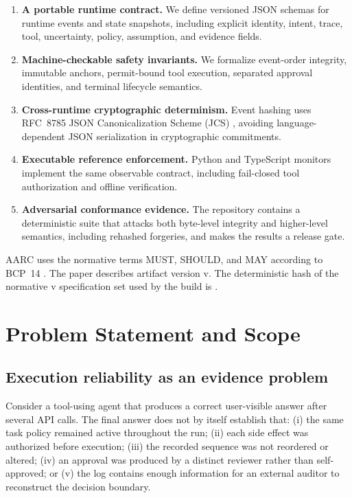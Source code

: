 \documentclass{article}
\begin{document}
\begin{enumerate}[leftmargin=*]
  \item \textbf{A portable runtime contract.} We define versioned JSON schemas
  for runtime events and state snapshots, including explicit identity, intent,
  trace, tool, uncertainty, policy, assumption, and evidence fields.
  \item \textbf{Machine-checkable safety invariants.} We formalize event-order
  integrity, immutable anchors, permit-bound tool execution, separated approval
  identities, and terminal lifecycle semantics.
  \item \textbf{Cross-runtime cryptographic determinism.} Event hashing uses
  RFC~8785 JSON Canonicalization Scheme (JCS) \cite{rfc8785}, avoiding
  language-dependent JSON serialization in cryptographic commitments.
  \item \textbf{Executable reference enforcement.} Python and TypeScript
  monitors implement the same observable contract, including fail-closed tool
  authorization and offline verification.
  \item \textbf{Adversarial conformance evidence.} The repository contains a
  deterministic suite that attacks both byte-level integrity and higher-level
  semantics, including rehashed forgeries, and makes the results a release gate.
\end{enumerate}

AARC uses the normative terms MUST, SHOULD, and MAY according to BCP~14
\cite{rfc2119,rfc8174}. The paper describes artifact version
v\specVersion{}. The deterministic hash of the normative v\specVersion{}
specification set used by the build is
\texttt{\specHash}.

\section{Problem Statement and Scope}

\subsection{Execution reliability as an evidence problem}

Consider a tool-using agent that produces a correct user-visible answer after
several API calls. The final answer does not by itself establish that:
(i) the same task policy remained active throughout the run;
(ii) each side effect was authorized before execution;
(iii) the recorded sequence was not reordered or altered;
(iv) an approval was produced by a distinct reviewer rather than self-approved;
or (v) the log contains enough information for an external auditor to reconstruct
the decision boundary.
\end{document}
